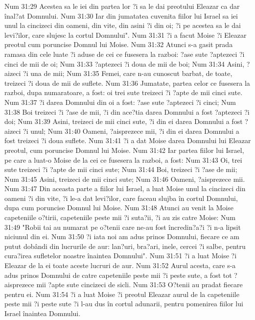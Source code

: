 Num 31:29  Acestea sa le iei din partea lor ?i sa le dai preotului Eleazar ca dar înal?at Domnului.
Num 31:30  Iar din jumatatea cuvenita fiilor lui Israel sa iei unul la cincizeci din oameni, din vite, din asini ?i din oi; ?i pe acestea sa le dai levi?ilor, care slujesc la cortul Domnului".
Num 31:31  ?i a facut Moise ?i Eleazar preotul cum poruncise Domnul lui Moise.
Num 31:32  Atunci s-a gasit prada ramasa din cele luate ?i aduse de cei ce fusesera la razboi: ?ase sute ?aptezeci ?i cinci de mii de oi;
Num 31:33  ?aptezeci ?i doua de mii de boi;
Num 31:34  Asini, ?aizeci ?i una de mii;
Num 31:35  Femei, care n-au cunoscut barbat, de toate, treizeci ?i doua de mii de suflete.
Num 31:36  Jumatate, partea celor ce fusesera la razboi, dupa numaratoare, a fost: oi trei sute treizeci ?i ?apte de mii cinci sute.
Num 31:37  ?i darea Domnului din oi a fost: ?ase sute ?aptezeci ?i cinci;
Num 31:38  Boi treizeci ?i ?ase de mii, ?i din ace?tia darea Domnului a fost ?aptezeci ?i doi;
Num 31:39  Asini, treizeci de mii cinci sute, ?i din ei darea Domnului a fost ?aizeci ?i unul;
Num 31:40  Oameni, ?aisprezece mii, ?i din ei darea Domnului a fost treizeci ?i doua suflete.
Num 31:41  ?i a dat Moise darea Domnului lui Eleazar preotul, cum poruncise Domnul lui Moise.
Num 31:42  Iar partea fiilor lui Israel, pe care a luat-o Moise de la cei ce fusesera la razboi, a fost:
Num 31:43  Oi, trei sute treizeci ?i ?apte de mii cinci sute;
Num 31:44  Boi, treizeci ?i ?ase de mii;
Num 31:45  Asini, treizeci de mii cinci sute;
Num 31:46  Oameni, ?aisprezece mii.
Num 31:47  Din aceasta parte a fiilor lui Israel, a luat Moise unul la cincizeci din oameni ?i din vite, ?i le-a dat levi?ilor, care faceau slujba în cortul Domnului, dupa cum poruncise Domnul lui Moise.
Num 31:48  Atunci au venit la Moise capeteniile o?tirii, capeteniile peste mii ?i suta?ii, ?i au zis catre Moise:
Num 31:49  "Robii tai au numarat pe o?tenii care ne-au fost încredin?a?i ?i n-a lipsit niciunul din ei.
Num 31:50  ?i iata noi am adus prinos Domnului, fiecare ce am putut dobândi din lucrurile de aur: lan?uri, bra?ari, inele, cercei ?i salbe, pentru cura?irea sufletelor noastre înaintea Domnului".
Num 31:51  ?i a luat Moise ?i Eleazar de la ei toate aceste lucruri de aur.
Num 31:52  Aurul acesta, care s-a adus prinos Domnului de catre capeteniile peste mii ?i peste sute, a fost tot ?aisprezece mii ?apte sute cincizeci de sicli.
Num 31:53  O?tenii au pradat fiecare pentru ei.
Num 31:54  ?i a luat Moise ?i preotul Eleazar aurul de la capeteniile peste mii ?i peste sute ?i l-au dus în cortul adunarii, pentru pomenirea fiilor lui Israel înaintea Domnului.
